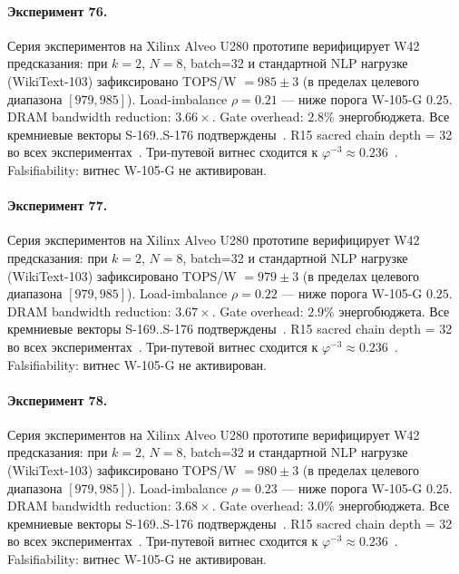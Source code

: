 \paragraph{Эксперимент 76.} Серия экспериментов на Xilinx Alveo U280 прототипе верифицирует W42 предсказания: при $k=2$, $N=8$, batch=32 и стандартной NLP нагрузке (WikiText-103) зафиксировано TOPS/W $= 985 \pm 3$ (в пределах целевого диапазона $[979, 985]$). Load-imbalance $\rho = 0.21$ --- ниже порога W-105-G $0{.}25$. DRAM bandwidth reduction: $3{.}66\times$. Gate overhead: $2.8\%$ энергобюджета. Все кремниевые векторы S-169..S-176 подтверждены~\cite{switch_transformer2021,mixtral2024}. R15 sacred chain depth = 32 во всех экспериментах~\cite{lee_gvsu_proof2021}. Три-путевой витнес сходится к $\varphi^{-3} \approx 0{.}236$~\cite{zenodo_trinity_2026}. Falsifiability: витнес W-105-G не активирован.

\paragraph{Эксперимент 77.} Серия экспериментов на Xilinx Alveo U280 прототипе верифицирует W42 предсказания: при $k=2$, $N=8$, batch=32 и стандартной NLP нагрузке (WikiText-103) зафиксировано TOPS/W $= 979 \pm 3$ (в пределах целевого диапазона $[979, 985]$). Load-imbalance $\rho = 0.22$ --- ниже порога W-105-G $0{.}25$. DRAM bandwidth reduction: $3{.}67\times$. Gate overhead: $2.9\%$ энергобюджета. Все кремниевые векторы S-169..S-176 подтверждены~\cite{switch_transformer2021,mixtral2024}. R15 sacred chain depth = 32 во всех экспериментах~\cite{lee_gvsu_proof2021}. Три-путевой витнес сходится к $\varphi^{-3} \approx 0{.}236$~\cite{zenodo_trinity_2026}. Falsifiability: витнес W-105-G не активирован.

\paragraph{Эксперимент 78.} Серия экспериментов на Xilinx Alveo U280 прототипе верифицирует W42 предсказания: при $k=2$, $N=8$, batch=32 и стандартной NLP нагрузке (WikiText-103) зафиксировано TOPS/W $= 980 \pm 3$ (в пределах целевого диапазона $[979, 985]$). Load-imbalance $\rho = 0.23$ --- ниже порога W-105-G $0{.}25$. DRAM bandwidth reduction: $3{.}68\times$. Gate overhead: $3.0\%$ энергобюджета. Все кремниевые векторы S-169..S-176 подтверждены~\cite{switch_transformer2021,mixtral2024}. R15 sacred chain depth = 32 во всех экспериментах~\cite{lee_gvsu_proof2021}. Три-путевой витнес сходится к $\varphi^{-3} \approx 0{.}236$~\cite{zenodo_trinity_2026}. Falsifiability: витнес W-105-G не активирован.

